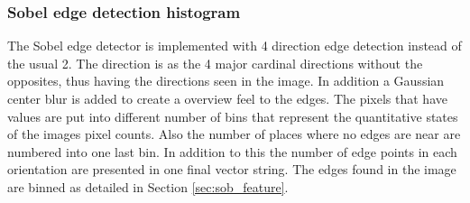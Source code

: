 \subsubsection{Sobel edge detection histogram}
\label{sec:meth:featextr:edge}
The Sobel edge detector is implemented with 4 direction edge detection instead of the usual 2. The direction is as the 4 major cardinal directions without the opposites, thus having the directions seen in the image. In addition a Gaussian center blur is added to create a overview feel to the edges. The pixels that have values are put into different number of bins that represent the quantitative states of the images pixel counts. Also the number of places where no edges are near are numbered into one last bin. In addition to this the number of edge points in each orientation are presented in one final vector string. The edges found in the image are binned as detailed in Section \ref{sec:sob_feature}.




